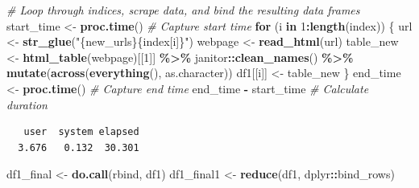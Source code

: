 \documentclass[
]{book}
\newenvironment{Shaded}{\begin{snugshade}}{\end{snugshade}}
\newcommand{\CommentTok}[1]{\textcolor[rgb]{0.56,0.35,0.01}{\textit{#1}}}
\newcommand{\ControlFlowTok}[1]{\textcolor[rgb]{0.13,0.29,0.53}{\textbf{#1}}}
\newcommand{\DecValTok}[1]{\textcolor[rgb]{0.00,0.00,0.81}{#1}}
\newcommand{\FunctionTok}[1]{\textcolor[rgb]{0.13,0.29,0.53}{\textbf{#1}}}
\newcommand{\NormalTok}[1]{#1}
\newcommand{\OtherTok}[1]{\textcolor[rgb]{0.56,0.35,0.01}{#1}}
\newcommand{\SpecialCharTok}[1]{\textcolor[rgb]{0.81,0.36,0.00}{\textbf{#1}}}
\newcommand{\StringTok}[1]{\textcolor[rgb]{0.31,0.60,0.02}{#1}}
\begin{document}
\begin{Shaded}
\begin{Highlighting}[]
\CommentTok{\# Loop through indices, scrape data, and bind the resulting data frames}
\NormalTok{start\_time }\OtherTok{\textless{}{-}} \FunctionTok{proc.time}\NormalTok{() }\CommentTok{\# Capture start time}
\ControlFlowTok{for}\NormalTok{ (i }\ControlFlowTok{in} \DecValTok{1}\SpecialCharTok{:}\FunctionTok{length}\NormalTok{(index)) \{}
\NormalTok{  url }\OtherTok{\textless{}{-}} \FunctionTok{str\_glue}\NormalTok{(}\StringTok{"\{new\_urls\}\{index[i]\}"}\NormalTok{)}
\NormalTok{  webpage }\OtherTok{\textless{}{-}} \FunctionTok{read\_html}\NormalTok{(url)}
\NormalTok{  table\_new }\OtherTok{\textless{}{-}} \FunctionTok{html\_table}\NormalTok{(webpage)[[}\DecValTok{1}\NormalTok{]] }\SpecialCharTok{\%\textgreater{}\%}
\NormalTok{    janitor}\SpecialCharTok{::}\FunctionTok{clean\_names}\NormalTok{() }\SpecialCharTok{\%\textgreater{}\%}
    \FunctionTok{mutate}\NormalTok{(}\FunctionTok{across}\NormalTok{(}\FunctionTok{everything}\NormalTok{(), as.character))}
\NormalTok{  df1[[i]] }\OtherTok{\textless{}{-}}\NormalTok{ table\_new}
\NormalTok{\}}
\NormalTok{end\_time }\OtherTok{\textless{}{-}} \FunctionTok{proc.time}\NormalTok{() }\CommentTok{\# Capture end time}
\NormalTok{end\_time }\SpecialCharTok{{-}}\NormalTok{ start\_time }\CommentTok{\# Calculate duration}
\end{Highlighting}
\end{Shaded}

\begin{verbatim}
   user  system elapsed 
  3.676   0.132  30.301 
\end{verbatim}

\begin{Shaded}
\begin{Highlighting}[]
\NormalTok{df1\_final }\OtherTok{\textless{}{-}} \FunctionTok{do.call}\NormalTok{(rbind, df1)}
\NormalTok{df1\_final1 }\OtherTok{\textless{}{-}} \FunctionTok{reduce}\NormalTok{(df1, dplyr}\SpecialCharTok{::}\NormalTok{bind\_rows)}
\end{Highlighting}
\end{Shaded}
\end{document}
